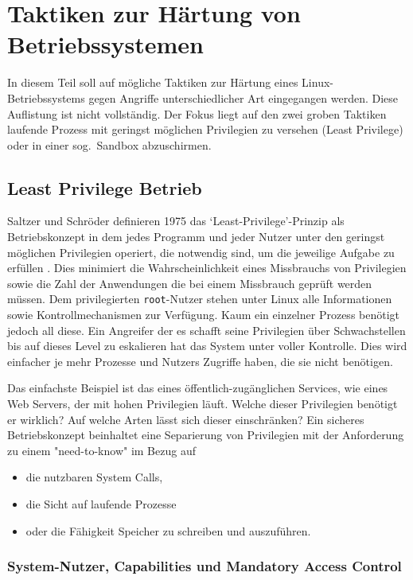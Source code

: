
\chapter{Taktiken zur Härtung von Betriebssystemen}

In diesem Teil soll auf mögliche Taktiken zur Härtung eines Linux-Betriebssystems gegen Angriffe unterschiedlicher Art eingegangen werden. Diese Auflistung ist nicht vollständig. Der Fokus liegt auf den zwei groben Taktiken laufende Prozess mit geringst möglichen Privilegien zu versehen (\gls{Least Privilege}) oder in einer sog.\ \gls{Sandbox} abzuschirmen.

\section{Least Privilege Betrieb}

Saltzer und Schröder definieren 1975 das `Least-Privilege'-Prinzip als Betriebskonzept in dem jedes Programm und jeder Nutzer unter den geringst möglichen Privilegien operiert, die notwendig sind, um die jeweilige Aufgabe zu erfüllen \cite{saltzer_1975}. Dies minimiert die Wahrscheinlichkeit eines Missbrauchs von Privilegien sowie die Zahl der Anwendungen die bei einem Missbrauch geprüft werden müssen. 
Dem privilegierten \texttt{root}-Nutzer stehen unter Linux alle Informationen sowie Kontrollmechanismen zur Verfügung. Kaum ein einzelner Prozess benötigt jedoch all diese. Ein Angreifer der es schafft seine Privilegien über Schwachstellen bis auf dieses Level zu eskalieren hat das System unter voller Kontrolle. Dies wird einfacher je mehr Prozesse und Nutzers Zugriffe haben, die sie nicht benötigen.

Das einfachste Beispiel ist das eines öffentlich-zugänglichen Services, wie eines Web Servers, der mit hohen Privilegien läuft. Welche dieser Privilegien benötigt er wirklich? Auf welche Arten lässt sich dieser einschränken?
Ein sicheres Betriebskonzept beinhaltet eine Separierung von Privilegien mit der Anforderung zu einem "need-to-know" im Bezug auf 
\begin{itemize}
  \item die nutzbaren System Calls,
  \item die Sicht auf laufende Prozesse
  \item oder die Fähigkeit Speicher zu schreiben und auszuführen.
\end{itemize}

\subsection{System-Nutzer, Capabilities und Mandatory Access Control}

